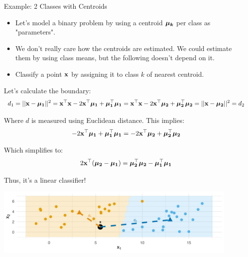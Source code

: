\documentclass[11pt,compress,t,notes=noshow, xcolor=table]{beamer}
\begin{document}
\begin{frame}{Example: 2 Classes with Centroids}


 {
\begin{itemize}
\item Let's model a binary problem by using a centroid $\muk$ per class as "parameters". 

\item  We don't really care how the centroids are estimated. We could estimate them by using class means, but the following doesn't depend on it.

\item Classify a point $\xv$ by assigning it to class $k$ of nearest centroid.

\end{itemize}
}

 {

Let's calculate the boundary:
$$
d_1 = ||\xv - \muk[1]||^2 = \xv^\top \xv - 2 \xv^\top \muk[1] + \muk[1]^\top \muk[1]
= \xv^\top \xv - 2 \xv^\top \muk[2] + \muk[2]^\top \muk[2] = ||\xv - \muk[2]||^2 = d_2
$$

Where $d$ is measured using Euclidean distance. This implies:
$$
-2 \xv^\top \muk[1] + \muk[1]^\top \muk[1]
= -2 \xv^\top \muk[2] + \muk[2]^\top \muk[2]
$$

Which simplifies to:
$$
2 \xv^\top (\muk[2] - \muk[1]) =\muk[2]^\top \muk[2] - \muk[1]^\top \muk[1]
$$

Thus, it's a linear classifier!
}

\vspace{-0.85em}
\begin{center}
\includegraphics[width=0.9\textwidth]{figure/nearest_centroid_classifier.png} 
\end{center}

\end{frame}
\end{document}
